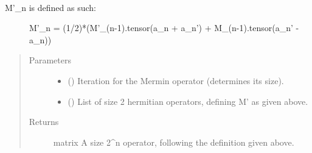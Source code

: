 \documentclass[letterpaper,10pt,english]{sphinxmanual}
\begin{document}
\begin{fulllineitems}
\label{\detokenize{mermin_eval:mermin_eval.M_prime_all}}~\begin{description}
\item[{M’\_n is defined as such:}] \leavevmode
M’\_n = (1/2)*(M’\_(n-1).tensor(a\_n + a\_n’) + M\_(n-1).tensor(a\_n’ - a\_n))

\end{description}
\begin{quote}\begin{description}
\item[{Parameters}] \leavevmode\begin{itemize}
\item {} 
 () \textendash{} Iteration for the Mermin operator (determines its size).

\item {} 
\sphinxstyleliteralstrong{\sphinxupquote{,}} (\sphinxstyleliteralemphasis{\sphinxupquote{{[}}}\sphinxstyleliteralemphasis{\sphinxupquote{{]}}}) \textendash{} List of size 2 hermitian operators, defining M’ 
as given above.

\end{itemize}

\item[{Returns}] \leavevmode
matrix \textendash{} A size 2\textasciicircum{}n operator, following the definition given 
above.

\end{description}\end{quote}

\end{fulllineitems}

\end{document}
